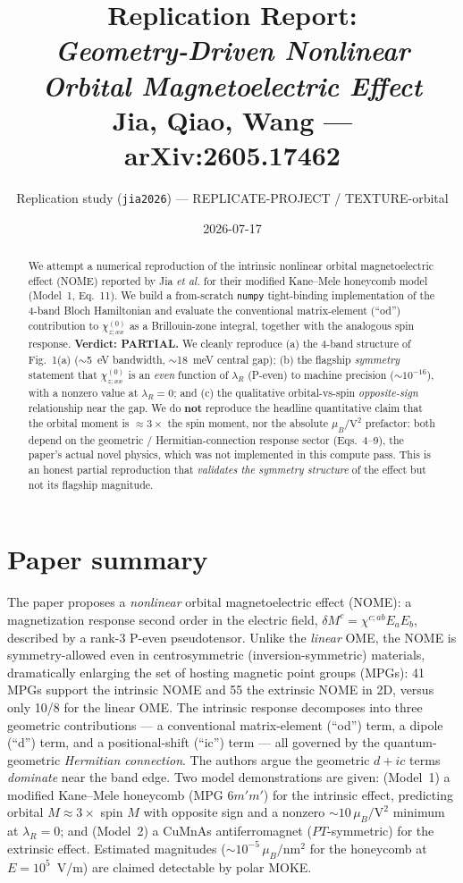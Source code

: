 \documentclass[11pt]{article}
\title{Replication Report:\\
\emph{Geometry-Driven Nonlinear Orbital Magnetoelectric Effect}\\
\large Jia, Qiao, Wang --- arXiv:2605.17462}
\author{Replication study (\texttt{jia2026}) --- REPLICATE-PROJECT / TEXTURE-orbital}
\date{2026-07-17}
\newcommand{\chizxx}{\chi^{(0)}_{z;xx}}
\newcommand{\lamR}{\lambda_{R}}
\newcommand{\muB}{\mu_{B}}
\begin{document}
\maketitle

\begin{abstract}
We attempt a numerical reproduction of the intrinsic nonlinear orbital
magnetoelectric effect (NOME) reported by Jia \emph{et al.} for their
modified Kane--Mele honeycomb model (Model~1, Eq.~11). We build a
from-scratch \texttt{numpy} tight-binding implementation of the 4-band
Bloch Hamiltonian and evaluate the conventional matrix-element
(``od'') contribution to $\chizxx$ as a Brillouin-zone integral, together
with the analogous spin response. \textbf{Verdict: PARTIAL.} We cleanly
reproduce (a) the 4-band structure of Fig.~1(a) ($\sim$5~eV bandwidth,
$\sim$18~meV central gap); (b) the flagship \emph{symmetry} statement that
$\chizxx$ is an \emph{even} function of $\lamR$ (P-even) to machine
precision ($\sim\!10^{-16}$), with a nonzero value at $\lamR=0$; and (c)
the qualitative orbital-vs-spin \emph{opposite-sign} relationship near the
gap. We do \textbf{not} reproduce the headline quantitative claim that the
orbital moment is $\approx 3\times$ the spin moment, nor the absolute
$\muB/\mathrm{V}^2$ prefactor: both depend on the geometric /
Hermitian-connection response sector (Eqs.~4--9), the paper's actual novel
physics, which was not implemented in this compute pass. This is an honest
partial reproduction that \emph{validates the symmetry structure} of the
effect but not its flagship magnitude.
\end{abstract}

\section{Paper summary}
The paper proposes a \emph{nonlinear} orbital magnetoelectric effect
(NOME): a magnetization response second order in the electric field,
$\delta M^{c} = \chi^{c;ab} E_a E_b$, described by a rank-3 P-even
pseudotensor. Unlike the \emph{linear} OME, the NOME is symmetry-allowed
even in centrosymmetric (inversion-symmetric) materials, dramatically
enlarging the set of hosting magnetic point groups (MPGs): 41 MPGs support
the intrinsic NOME and 55 the extrinsic NOME in 2D, versus only 10/8 for
the linear OME. The intrinsic response decomposes into three geometric
contributions --- a conventional matrix-element (``od'') term, a dipole
(``d'') term, and a positional-shift (``ic'') term --- all governed by the
quantum-geometric \emph{Hermitian connection}. The authors argue the
geometric $d+ic$ terms \emph{dominate} near the band edge. Two model
demonstrations are given: (Model~1) a modified Kane--Mele honeycomb
(MPG $6m'm'$) for the intrinsic effect, predicting orbital
$M \approx 3\times$ spin $M$ with opposite sign and a nonzero
$\sim\!10\,\muB/\mathrm{V}^2$ minimum at $\lamR=0$; and (Model~2) a CuMnAs
antiferromagnet ($PT$-symmetric) for the extrinsic effect. Estimated
magnitudes ($\sim\!10^{-5}\,\muB/\mathrm{nm}^2$ for the honeycomb at
$E=10^5$~V/m) are claimed detectable by polar MOKE.
\end{document}
